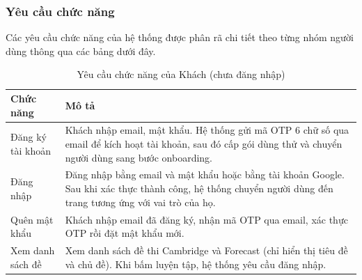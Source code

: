 \subsubsection{Yêu cầu chức năng}
Các yêu cầu chức năng của hệ thống được phân rã chi tiết theo từng nhóm người dùng thông qua các bảng dưới đây.

\begin{table}[H]
\centering
\caption{Yêu cầu chức năng của Khách (chưa đăng nhập)}
\label{wispace:tab:func_guest}
\small
\begin{tabular}{|p{4.2cm}|p{\dimexpr\linewidth-4.2cm-4\tabcolsep-3\arrayrulewidth\relax}|}
\hline
\textbf{Chức năng} & \textbf{Mô tả} \\
\hline
Đăng ký tài khoản & Khách nhập email, mật khẩu. Hệ thống gửi mã OTP 6 chữ số qua email để kích hoạt tài khoản, sau đó cấp gói dùng thử và chuyển người dùng sang bước onboarding. \\
\hline
Đăng nhập & Đăng nhập bằng email và mật khẩu hoặc bằng tài khoản Google. Sau khi xác thực thành công, hệ thống chuyển người dùng đến trang tương ứng với vai trò của họ. \\
\hline
Quên mật khẩu & Khách nhập email đã đăng ký, nhận mã OTP qua email, xác thực OTP rồi đặt mật khẩu mới. \\
\hline
Xem danh sách đề & Xem danh sách đề thi Cambridge và Forecast (chỉ hiển thị tiêu đề và chủ đề). Khi bấm luyện tập, hệ thống yêu cầu đăng nhập. \\
\hline
\end{tabular}
\end{table}

